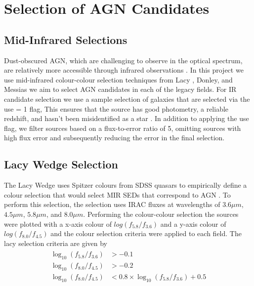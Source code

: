 \documentclass[12pt]{iopart}
\begin{document}
\section{Selection of AGN Candidates}
\subsection{Mid-Infrared Selections}
Dust-obscured AGN, which are challenging to observe in the optical spectrum, are relatively more accessible through infrared observations \cite{yutani_origin_2022}. In this project we use mid-infrared colour-colour selection techniques from Lacy \cite{lacy_obscured_2004, lacy_optical_2007}, Donley\cite{donley_spitzer_2007, donley_identifying_2012}, and Messias \cite{messias_new_2012, messias_dependency_2014} we aim to select AGN candidates in each of the legacy fields. For IR candidate selection we use a sample selection of galaxies that are selected via the use = 1 flag, This ensures that the source has good photometry, a reliable redshift, and hasn't been misidentified as a star \cite{straatman_fourstar_2016}. In addition to applying the use flag, we filter sources based on a flux-to-error ratio of 5, omitting sources with high flux error and subsequently reducing the error in the final selection.
\subsection{Lacy Wedge Selection}
The Lacy Wedge uses Spitzer colours from SDSS quasars to empirically define a colour selection that would select MIR SEDs that correspond to AGN \cite{lacy_obscured_2004}. To perform this selection, the selection uses IRAC fluxes at wavelengths of $3.6\mu m$, $4.5\mu m$, $5.8\mu m$, and $8.0\mu m$. Performing the colour-colour selection the sources were plotted with a x-axis colour of $log(f_{5.8}/f_{3.6})$ and a y-axis colour of $log(f_{8.0}/f_{4.5})$ and the colour selection criteria were applied to each field. The lacy selection criteria are given by
\begin{align*}
    \begin{split}
       \log_{10}\left(f_{5.8}/f_{3.6}\right)&>-0.1\\
       \log_{10}\left(f_{8.0}/f_{4.5}\right)&>-0.2\\
       \log_{10}\left(f_{8.0}/f_{4.5}\right)&<0.8\times\log_{10}\left(f_{5.8}/f_{3.6}\right)+0.5
    \end{split}
\end{align*}
\end{document}
